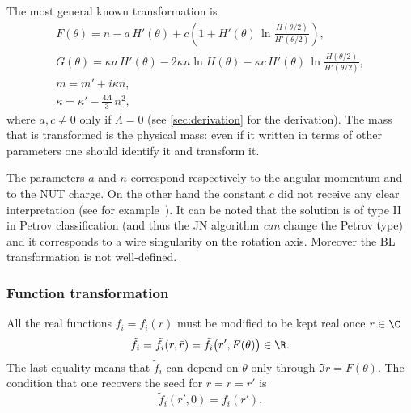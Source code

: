 The most general known transformation is
\begin{subequations}
\begin{gather}
	\label{gen:eq:change:jna-functions-FG}
	F(\theta) = n - a\, H'(\theta) + c \left( 1 + H'(\theta)\, \ln \frac{H(\theta/2)}{H'(\theta/2)} \right), \\
	G(\theta) = \kappa a\, H'(\theta)
		- 2 \kappa n \ln H(\theta)
		- \kappa c\, H'(\theta)\, \ln \frac{H(\theta/2)}{H'(\theta/2)}, \\
	m = m' + i \kappa n, \\
	\kappa = \kappa' - \frac{4\Lambda}{3}\, n^2,
\end{gather}
\end{subequations}
where $a, c \neq 0$ only if $\Lambda = 0$ (see \cref{sec:derivation} for the derivation).
The mass that is transformed is the physical mass: even if it written in terms of other parameters one should identify it and transform it.

The parameters $a$ and $n$ correspond respectively to the angular momentum and to the NUT charge.
On the other hand the constant $c$ did not receive any clear interpretation (see for example~\cites{Demianski:1972:NewKerrlikeSpacetime, Adamo:2014:KerrNewmanMetricReview}[sec.~5.3]{Krasinski:2006:InhomogeneousCosmologicalModels}).
It can be noted that the solution is of type II in Petrov classification (and thus the JN algorithm \emph{can} change the Petrov type) and it corresponds to a wire singularity on the rotation axis.
Moreover the BL transformation is not well-defined.


\subsubsection{Function transformation}
\label{sec:general:jna:functions}


All the real functions $f_i = f_i(r)$ must be modified to be kept real once $r \in \C$
\begin{equation}
	\label{gen:eq:complexification-functions}
	\tilde f_i = \tilde f_i(r, \bar r)
		= \tilde f_i\big(r', F(\theta) \big) \in \R.
\end{equation} 
The last equality means that $\tilde f_i$ can depend on $\theta$ only through $\Im r = F(\theta)$.
The condition that one recovers the seed for $\bar r = r = r'$ is
\begin{equation}
	\tilde f_i(r', 0) = f_i(r').
\end{equation} 

